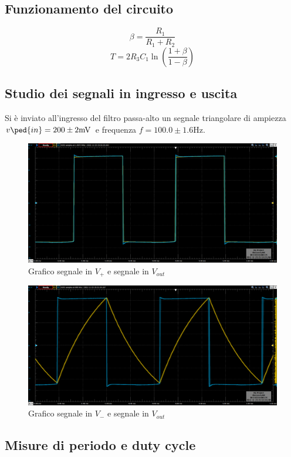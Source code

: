 \documentclass[10pt,a4paper]{article}
\begin{document}
\subsection{Funzionamento del circuito}
\[
\beta= \frac{R_1}{R_1 + R_2}
\]
\[
T = 2 R_3 C_1 \ln(\frac{1+\beta}{1-\beta})
\]


\setcounter{subsection}{2}
\subsection{Studio dei segnali in ingresso e uscita}
Si è inviato all'ingresso del filtro passa-alto un segnale triangolare di
ampiezza $v\ped{in} = 200 \pm 2 \si{m\V}$ e frequenza
$f = 100.0 \pm 1.6 \si{\Hz}$.

\begin{figure}[htbp]
\centering
\includegraphics[scale=0.4]{V+Vout}
\caption{Grafico segnale in $V_+$ e segnale in $V_{out}$}
\end{figure}

\begin{figure}[htbp]
\centering
\includegraphics[scale=0.4]{V-Vout}
\caption{Grafico segnale in $V_-$ e segnale in $V_{out}$}
\end{figure}


\subsection{Misure di periodo e duty cycle}
\end{document}
